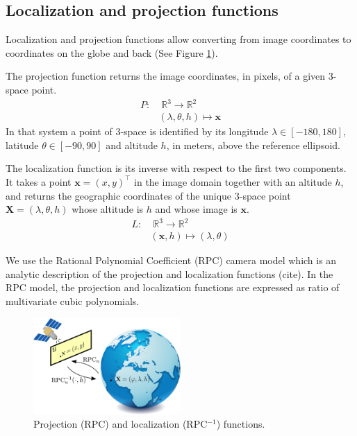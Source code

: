 \documentclass[paper=a4, fontsize=11pt, onecolumn, tikz, dvipsnames, svgnames, x11names]{article}
\begin{document}
\subsection{Localization and projection functions}
Localization and projection functions  allow converting from image coordinates to coordinates
on the globe and back (See Figure \ref{rpc}).


The projection function returns the image coordinates, in pixels, of a given 3-space
point. 
\begin{align*}
P:&\; \mathbb{R}^3\to\mathbb{R}^2\\
&(\lambda, \theta, h) \mapsto \textbf{x}
\end{align*}
In that system a point of 3-space is identified by its
longitude $\lambda\in[-180,180]$, latitude $\theta\in[-90,90]$ and
altitude $h$, in meters, above the reference ellipsoid. 


The localization function is its
inverse with respect to the first two components. It takes a point $\textbf{x}
= (x, y)^\top$ in the image domain together with an altitude $h$, and
returns the geographic coordinates of the unique 3-space point
$\textbf{X} = (\lambda, \theta, h)$ whose altitude is $h$ and whose image is $\textbf{x}$.
\begin{align*}
L:&\; \mathbb{R}^3\to\mathbb{R}^2\\
&(\textbf{x}, h) \mapsto (\lambda, \theta)
\end{align*}



We use the Rational Polynomial Coefficient (RPC) camera model which is an
analytic description of the projection and localization functions (cite). In the RPC model, the projection and
localization functions are expressed as ratio of multivariate cubic
polynomials.

\begin{figure}[h]
    \centering
    \includegraphics[width=0.5\textwidth]{figures/rpc_illustration.png}
   \caption{ Projection (RPC) and localization (RPC$^{-1}$) functions.}
   \label{rpc}
\end{figure}
\end{document}
